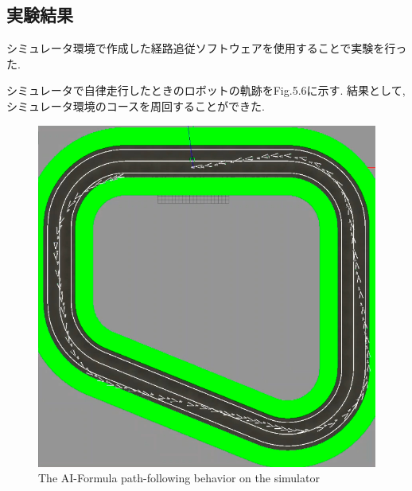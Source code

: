 \subsection{実験結果}
シミュレータ環境で作成した経路追従ソフトウェアを使用することで実験を行った.

シミュレータで自律走行したときのロボットの軌跡をFig.5.6に示す.
結果として, シミュレータ環境のコースを周回することができた.

\begin{figure}[H]
  \centering
 \includegraphics[keepaspectratio, scale=0.5]
      {images/simulatorfollowerpath.png}
 \caption{The AI-Formula path-following behavior on the simulator}
 \label{fig:simulatorpath}
\end{figure}